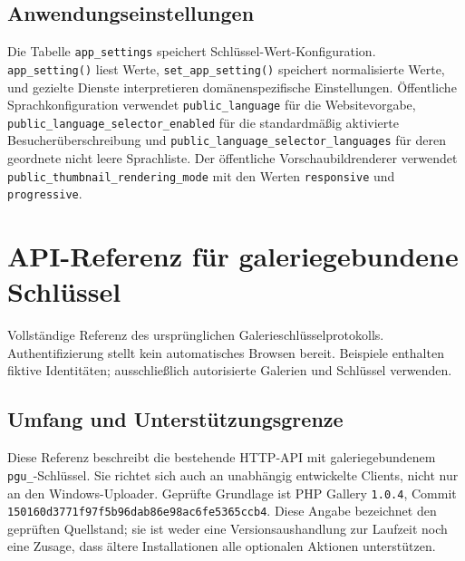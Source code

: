 \documentclass[11pt,a4paper]{article}
\newcommand{\setting}[1]{\nolinkurl{#1}}
\newcommand{\codeword}[1]{\nolinkurl{#1}}
\begin{document}
\subsection{Anwendungseinstellungen}

Die Tabelle \codeword{app_settings} speichert Schlüssel-Wert-Konfiguration.
\codeword{app_setting()} liest Werte, \codeword{set_app_setting()} speichert
normalisierte Werte, und gezielte Dienste interpretieren domänenspezifische
Einstellungen. Öffentliche Sprachkonfiguration verwendet
\setting{public_language} für die Websitevorgabe,
\setting{public_language_selector_enabled} für die standardmäßig aktivierte
Besucherüberschreibung und \setting{public_language_selector_languages} für
deren geordnete nicht leere Sprachliste. Der öffentliche Vorschaubildrenderer
verwendet \setting{public_thumbnail_rendering_mode} mit den Werten
\setting{responsive} und \setting{progressive}.



\section{API-Referenz für galeriegebundene Schlüssel}

\label{sec:gallery-key-api}


Vollständige Referenz des ursprünglichen Galerieschlüsselprotokolls. Authentifizierung
stellt kein automatisches Browsen bereit. Beispiele enthalten fiktive Identitäten;
ausschließlich autorisierte Galerien und Schlüssel verwenden.

\subsection{\texorpdfstring{Umfang und Unterstützungsgrenze}{Umfang und Unterstützungsgrenze}}

\label{api352:scope}

Diese Referenz beschreibt die bestehende HTTP-API mit galeriegebundenem
\codeword{pgu_}-Schlüssel. Sie richtet sich auch an unabhängig entwickelte Clients, nicht
nur an den Windows-Uploader. Geprüfte Grundlage ist PHP Gallery \codeword{1.0.4}, Commit
\codeword{150160d3771f97f5b96dab86e98ac6fe5365ccb4}. Diese Angabe bezeichnet den geprüften
Quellstand; sie ist weder eine Versionsaushandlung zur Laufzeit noch eine Zusage, dass
ältere Installationen alle optionalen Aktionen unterstützen.
\end{document}
